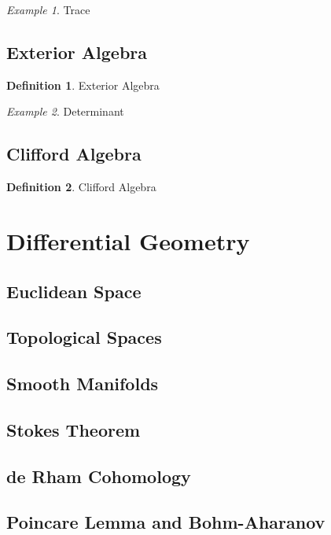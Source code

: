 \documentclass[12pt]{article}
\theoremstyle{definition}
\newtheorem{definition}{Definition}[section]
\theoremstyle{remark}
\theoremstyle{example}
\newtheorem{example}{Example}
\begin{document}
\begin{example}
	Trace
\end{example}

\subsection{Exterior Algebra}

\begin{definition}
	Exterior Algebra
\end{definition}

\begin{example}
	Determinant
\end{example}

\subsection{Clifford Algebra}

\begin{definition}
	Clifford Algebra
\end{definition}

\section{Differential Geometry}

\subsection{Euclidean Space}

\subsection{Topological Spaces}

\subsection{Smooth Manifolds}

\subsection{Stokes Theorem}

\subsection{de Rham Cohomology}

\subsection{Poincare Lemma and Bohm-Aharanov}
\end{document}
